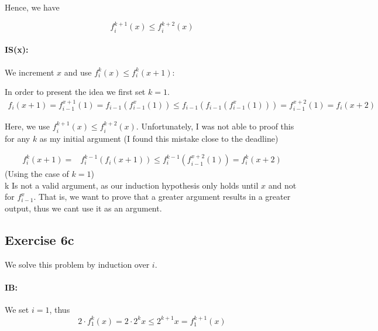 \documentclass[11pt,a4paper]{article}
\begin{document}
Hence, we have 

\begin{equation*}
f_{i}^{k+1}(x)  \leq f_i^{k+2}(x)   
\end{equation*}



\paragraph{IS(x):} We increment $x$ and use $f_i^k(x) \leq  f_i^{k}(x+1)$:

In order to present the idea we first set $k=1$.
\begin{equation*}
\begin{split}
f_{i}(x+1) =  f_{i-1}^{x+1}(1) =  f_{i-1}(f_{i-1}^{x}(1)) \leq  f_{i-1}(f_{i-1}(f_{i-1}^{x}(1))) = f_{i-1}^{x+2}(1) = f_{i}(x+2)
\end{split}
\end{equation*}

Here, we use $f_{i}^{k+1}(x)  \leq f_i^{k+2}(x)$.
Unfortunately, I was not able to proof this for any $k$ as my initial argument   (I found this mistake close to the deadline)

\begin{equation*}
\begin{split}
f_{i}^k(x+1) = & f_{i}^{k-1}(f_i(x+1))  \leq f_{i}^{k-1}(f_{i-1}^{x+2}(1)) = f_{i}^k(x+2)
\end{split}
\end{equation*}
(Using the case of $k=1$) \\k
Is not a valid argument, as our induction hypothesis only holds until $x$ and not for $f_{i-1}^{x}$.
That is, we want to prove that a greater argument results in a greater output, thus we cant use it as an argument.



\subsection*{Exercise 6c}

We solve this problem by induction over $i$.

\paragraph{IB:} We set $i=1$, thus 
\begin{equation*}
2 \cdot f_1^k(x) = 2\cdot 2^kx \leq 2^{k+1}x = f_1^{k+1}(x) 
\end{equation*}
\end{document}
